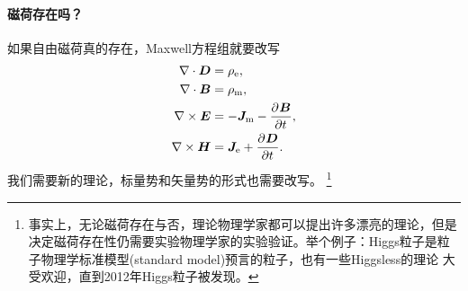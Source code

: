 \paragraph{磁荷存在吗？}
如果自由磁荷真的存在，Maxwell方程组就要改写
\begin{align*}
    \nabla\cdot\bm D&=\rho_\mathrm e,\\
    \nabla\cdot\bm B&=\rho_\text m,\\
    \nabla\times\bm E&=-\bm J_\text m-\frac{\partial^{{}}\bm B}{\partial{t}^{{}}},\\
    \nabla\times\bm H&=\bm J_\mathrm e+\frac{\partial^{{}}\bm D}{\partial{t}^{{}}}.
\end{align*}
我们需要新的理论，标量势和矢量势的形式也需要改写。
\footnote{事实上，无论磁荷存在与否，理论物理学家都可以提出许多漂亮的理论，但是决定磁荷存在性仍需要实验物理学家的实验验证。举个例子：Higgs粒子是粒子物理学标准模型(standard model)预言的粒子，也有一些Higgsless的理论
大受欢迎，直到2012年Higgs粒子被发现。}
